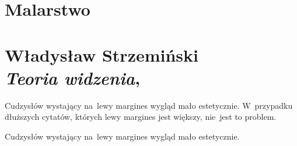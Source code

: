\documentclass[a4paper,11pt]{article}
\numberwithin{equation}{section}
\begin{document}










\newpage

\section{Malarstwo}

\VerSpaceTwo



\section{ %
  Władysław Strzemiński \\
  \textit{Teoria widzenia}, \cite{StrzeminskiTeoriaWidzenia2016}}




 Cudzysłów wystający na~lewy margines wygląd mało
estetycznie. W~przypadku dłuższych cytatów, których lewy margines jest
większy, nie~jest to problem.

\VerSpaceFour





 Cudzysłów wystający na~lewy margines wygląd mało
estetycznie.

\VerSpaceFour












\end{document}
